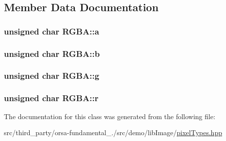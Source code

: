 \subsection{Member Data Documentation}
\hypertarget{classRGBA_a6f5c0a3907d077f8bf0965f482fe8662}{}
\subsubsection[{a}]{\setlength{\rightskip}{0pt plus 5cm}unsigned char R\+G\+B\+A\+::a}\label{classRGBA_a6f5c0a3907d077f8bf0965f482fe8662}
\hypertarget{classRGBA_a122b3a3e11b20e7fb0dc3bd45c877b0d}{}
\subsubsection[{b}]{\setlength{\rightskip}{0pt plus 5cm}unsigned char R\+G\+B\+A\+::b}\label{classRGBA_a122b3a3e11b20e7fb0dc3bd45c877b0d}
\hypertarget{classRGBA_a8004a0599db7d2142ddfc06368df39c7}{}
\subsubsection[{g}]{\setlength{\rightskip}{0pt plus 5cm}unsigned char R\+G\+B\+A\+::g}\label{classRGBA_a8004a0599db7d2142ddfc06368df39c7}
\hypertarget{classRGBA_af557a869b3d50a50fab6d1f8ecb0ad4b}{}
\subsubsection[{r}]{\setlength{\rightskip}{0pt plus 5cm}unsigned char R\+G\+B\+A\+::r}\label{classRGBA_af557a869b3d50a50fab6d1f8ecb0ad4b}


The documentation for this class was generated from the following file\+:\begin{DoxyCompactItemize}
\item 
src/third\+\_\+party/orsa-\/fundamental\+\_./src/demo/lib\+Image/\hyperlink{pixelTypes_8hpp}{pixel\+Types.\+hpp}\end{DoxyCompactItemize}
